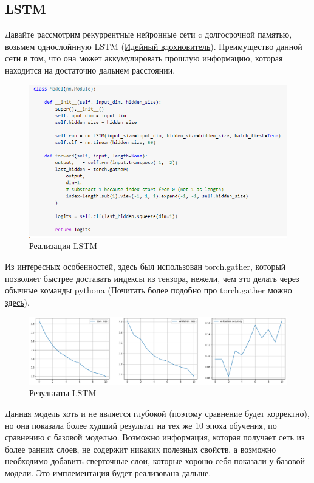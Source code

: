 \documentclass[a4paper,12pt]{article}
\begin{document}
 	\subsection{LSTM}
 	Давайте рассмотрим рекуррентные нейронные сети c долгосрочной памятью, возьмем однослойнную LSTM (\href{https://medium.com/@premtibadiya/music-genre-classification-using-rnn-lstm-1c212ba21e06}{Идейный вдохновитель}). Преимущество данной сети в том, что она может аккумулировать прошлую информацию, которая  находится на достаточно дальнем расстоянии. 
 	\begin{figure}[H]
 		\centering
 		\includegraphics[width=0.7\linewidth]{Image/Featurizer1}
 		\caption{Реализация LSTM}
 		\label{fig:featurizer1}
 	\end{figure}
	
	Из интересных особенностей, здесь был использован torch.gather, который позволяет быстрее доставать индексы из тензора, нежели, чем это делать через обычные команды pythona (Почитать более подобно про torch.gather можно \href{https://medium.com/@mbednarski/understanding-indexing-with-pytorch-gather-33717a84ebc4}{здесь}).
 
 
 	\begin{figure}[H]
 	\centering
 	\includegraphics[width=1\linewidth]{Image/LSTM_train.png}
 	\caption{Результаты LSTM}
 	\label{fig:featurizer1}
 \end{figure}
	Данная модель хоть и не является глубокой (поэтому сравнение будет корректно), но она показала более худший результат на тех же 10 эпоха обучения, по сравнению с базовой моделью. Возможно информация, которая получает сеть из более ранних слоев, не содержит никаких полезных свойств, а возможно необходимо добавить сверточные слои, которые хорошо себя показали у базовой модели. Это имплементация будет реализована дальше.
\end{document}
